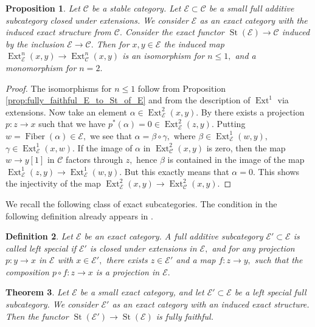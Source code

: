 \documentclass[11pt,leqno]{amsart}
\newtheorem{theo}{Theorem}[section]
\newtheorem{defi}[theo]{Definition}
\newtheorem{prop}[theo]{Proposition}
\numberwithin{equation}{section}
\newcommand{\Fiber}{\operatorname{Fiber}}
\newcommand{\St}{\operatorname{St}}
\newcommand{\cC}{{\mathcal C}}
\newcommand{\cE}{{\mathcal E}}
\newcommand{\Ext}{\operatorname{Ext}}
\begin{document}
\begin{prop}\label{prop:mono_on_Ext^2_for_small}
Let $\cC$ be a stable category. Let $\cE\subset\cC$ be a small full additive subcategory closed under extensions. We consider $\cE$ as an exact category with the induced exact structure from $\cC.$ Consider the exact functor $\St(\cE)\to\cC$ induced by the inclusion $\cE\to\cC.$ Then for $x,y\in\cE$ the induced map $\Ext^n_{\cE}(x,y)\to\Ext^n_{\cC}(x,y)$ is an isomorphism for $n\leq 1,$ and a monomorphism for $n=2.$
\end{prop}

\begin{proof}
The isomorphisms for $n\leq 1$ follow from Proposition \ref{prop:fully_faithful_E_to_St_of_E} and from the description of $\Ext^1$ via extensions. Now take an element $\alpha\in\Ext^2_{\cE}(x,y).$ By \cite[Lemma 4.3]{SW26} there exists a projection $p:z\to x$ such that we have $p^*(\alpha)=0\in\Ext^2_{\cE}(z,y).$ Putting $w=\Fiber(\alpha)\in\cE,$ we see that $\alpha=\beta\circ\gamma,$ where $\beta\in\Ext^1_{\cE}(w,y),$ $\gamma\in\Ext^1_{\cE}(x,w).$ If the image of $\alpha$ in $\Ext^2_{\cC}(x,y)$ is zero, then the map $w\to y[1]$ in $\cC$ factors through $z,$ hence $\beta$ is contained in the image of the map $\Ext^1_{\cE}(z,y)\to\Ext^1_{\cE}(w,y).$ But this exactly means that $\alpha=0.$ This shows the injectivity of the map $\Ext^2_{\cE}(x,y)\to\Ext^2_{\cC}(x,y).$    
\end{proof}

We recall the following class of exact subcategories. The condition in the following definition already appears in \cite{Kel96}.

\begin{defi}\cite[Definition 1.1]{SW26}\label{def:left_special} Let $\cE$ be an exact category. A full additive subcategory $\cE'\subset\cE$ is called left special if $\cE'$ is closed under extensions in $\cE,$ and for any projection $p:y\to x$ in $\cE$ with $x\in\cE',$ there exists $z\in\cE'$ and a map $f:z\to y,$ such that the composition $p\circ f:z\to x$ is a projection in $\cE.$
\end{defi}

\begin{theo}\cite[Theorem 4.5]{SW26}\label{th:left_special_implies_fully_faithful}
Let $\cE$ be a small exact category, and let $\cE'\subset\cE$ be a left special full subcategory. We consider $\cE'$ as an exact category with an induced exact structure. Then the functor $\St(\cE')\to\St(\cE)$ is fully faithful.
\end{theo}
\end{document}
